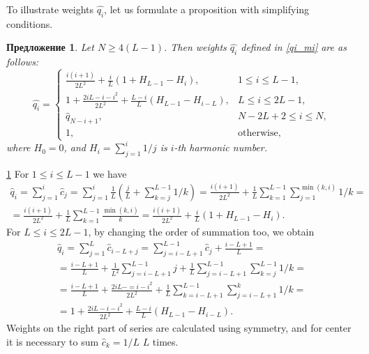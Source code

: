 \documentclass[12pt,a4paper,fleqn,leqno]{article}
\newtheorem{proposition}{Предложение}
\begin{document}
To illustrate weights $\hat{q_i}$, let us formulate a proposition with simplifying conditions.

\begin{proposition} \label{myserweightstat}
Let $N \ge 4(L-1)$. Then weights $\hat{q_i}$ defined in \eqref{qi_mi}
are as follows:
\begin{equation*}
\hat{q_i} = \begin{cases}
\frac{i(i+1)}{2 L^2} + \frac{i}{L}(1 + H_{L-1} - H_i), &1 \le i \le L-1, \\
1 + \frac{2iL-i-i^2}{2L^2} + \frac{L-i}{L}(H_{L-1} - H_{i - L}), & L \le i \le 2L-1, \\
\hat{q}_{N-i+1}, &N-2L+2 \le i \le N, \\
1, &\text{otherwise},
\end{cases}
\end{equation*}
where $H_0 = 0$, and $H_i = \sum_{j=1}^i 1/j$ is $i$-th harmonic number.
\end{proposition}

\begin{proof5}{\ref{myserweightstat}}
For $1 \le i \le L-1$ we have
\begin{gather*}
\hat{q}_i = \sum_{j=1}^i \hat{c}_j = \sum_{j=1}^i \frac{1}{L}\left(\frac{j}{L} + \sum_{k=j}^{L-1}1/k\right)\! =
\frac{i(i+1)}{2L^2}+\frac{1}{L} \sum_{k = 1}^{L-1} \sum_{j=1}^{\min(k,i)} 1/k =\\= \frac{i(i+1)}{2L^2}+\frac{1}{L} \sum_{k = 1}^{L-1} \frac{\min(k,i)}{k} = \frac{i(i+1)}{2 L^2} + \frac{i}{L}(1 + H_{L-1} - H_i).
\end{gather*}
For $L \le i \le 2L-1$, by changing the order of summation too, we obtain
\begin{gather*}
\hat{q}_i = \sum_{j = 1}^L \hat{c}_{i-L+j} = \sum_{j = i - L + 1}^{L - 1} \hat{c}_j + \frac{i - L + 1}{L} =\\
=\frac{i - L + 1}{L} + \frac{1}{L^2} \sum_{j = i - L + 1}^{L-1}j + \frac{1}{L} \sum_{j = i-L + 1}^{L-1} \sum_{k=j}^{L-1}1/k =\\
=\frac{i - L + 1}{L} + \frac{2iL - =i - i^2}{2L^2} + \frac{1}{L} \sum_{k = i - L + 1}^{L - 1} \sum_{j = i - L + 1}^k 1/k =\\
=1 + \frac{2iL-i-i^2}{2L^2} + \frac{L-i}{L}(H_{L-1} - H_{i - L}).
\end{gather*}
Weights on the right part of series are calculated using symmetry, and for center it is necessary to sum $\hat{c}_k = 1/L$ $L$ times.
\end{proof5}
\end{document}
